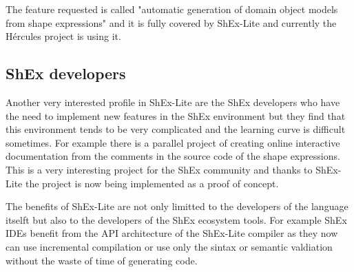 The feature requested is called "automatic generation of domain object models from shape expressions" and it is fully covered by ShEx-Lite and currently the Hércules project is using it.

\subsection{ShEx developers}
Another very interested profile in ShEx-Lite are the ShEx developers who have the need to implement new features in the ShEx environment but they find that this environment tends to be very complicated and the learning curve is difficult sometimes. For example there is a parallel project of creating online interactive documentation from the comments in the source code of the shape expressions. This is a very interesting project for the ShEx community and thanks to ShEx-Lite the project is now being implemented as a proof of concept.

The benefits of ShEx-Lite are not only limitted to the developers of the language itselft but also to the developers of the ShEx ecosystem tools. For example ShEx IDEs benefit from the API architecture of the ShEx-Lite compiler as they now can use incremental compilation or use only the sintax or semantic valdiation without the waste of time of generating code.
